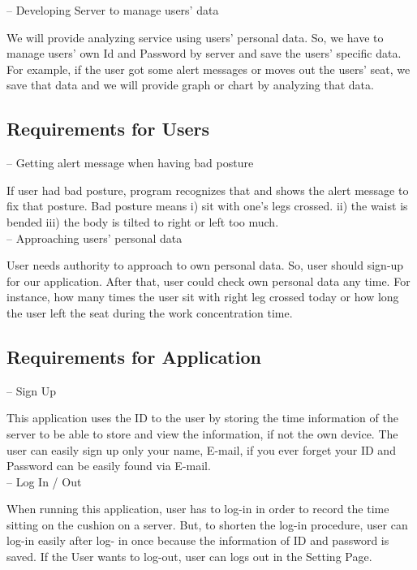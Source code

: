 \documentclass[conference]{IEEEtran}
\begin{document}
-- Developing  Server to manage users' data

We will provide analyzing service using users' personal data. So, we have to manage users' own Id and Password by server and save the users' specific data. For example, if the user got some alert messages or moves out the users' seat, we save that data and we will provide graph or chart by analyzing that data.\\

\subsection{Requirements for Users}
-- Getting alert message when having bad posture

If user had bad posture, program recognizes that and shows the alert message to fix that posture.  Bad posture means i) sit with one's legs crossed. ii) the waist is bended iii) the body is tilted to right or left too much.\\

-- Approaching users' personal data

User needs authority to approach to own personal data. So, user should sign-up for our application. After that, user could check own personal data any time. For instance, how many times the user sit with right leg crossed today or how long the user left the seat during the work concentration time.\\

\subsection{Requirements for Application}
-- Sign Up

This application uses the ID to the user by storing the time information of the server to be able to store and view the information, if not the own device. The user can easily sign up only your name, E-mail, if you ever forget your ID and Password can be easily found via E-mail.\\

-- Log In / Out

When running this application, user has to log-in in order to record the time sitting on the cushion on a server. But, to shorten the log-in procedure, user can log-in easily after log- in once because the information of ID and password is saved. If the User wants to log-out, user can logs out in the Setting Page.\\
\end{document}
